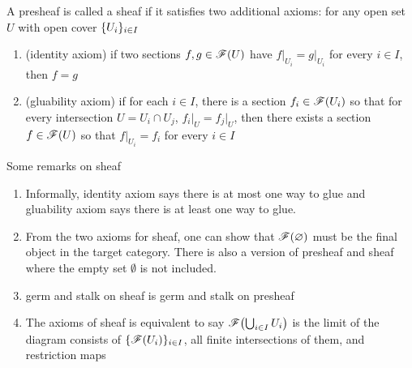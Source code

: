 \begin{definition}[sheaf]
	A presheaf is called a sheaf if it satisfies two additional axioms: for any open set $U$ with open cover $\{U_i\}_{i \in I}$
	\begin{enumerate}
		\item (identity axiom) if two sections $f, g \in \mathscr{F}(U)$ have $f\vert_{U_i} = g\vert_{U_i}$ for every $i \in I$, then $f = g$
		
		\item (gluability axiom) if for each $i \in I$, there is a section $f_i \in \mathscr{F}(U_i)$ so that for every intersection $U = U_i \cap U_j$, $f_i\vert_U = f_j\vert_U$, then there exists a section $f \in \mathscr{F}(U)$ so that $f\vert_{U_i} = f_i$ for every $i \in I$
	\end{enumerate}
\end{definition}

\begin{remark}
	Some remarks on sheaf
	\begin{enumerate}
		\item Informally, identity axiom says there is at most one way to glue and gluability axiom says there is at least one way to glue.
		
		\item From the two axioms for sheaf, one can show that $\mathscr{F}(\varnothing)$ must be the final object in the target category. There is also a version of presheaf and sheaf where the empty set $\emptyset$ is not included.
		
		\item germ and stalk on sheaf is germ and stalk on presheaf
		
		\item The axioms of sheaf is equivalent to say $\ms{F}\tuple*{\bigcup_{i \in I} U_i}$ is the limit of the diagram consists of $\{\mathscr{F}(U_i)\}_{i \in I}$, all finite intersections of them, and restriction maps
		\begin{center}
		\end{center}
	\end{enumerate}
\end{remark}

